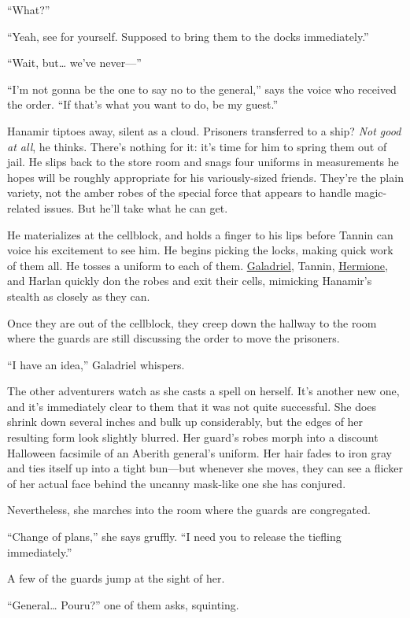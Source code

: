 \documentclass[smalldemyvopaper,11pt,twoside,onecolumn,openright,extrafontsizes]{memoir}
\begin{document}
``What?''

``Yeah, see for yourself. Supposed to bring them to the docks
immediately.''

``Wait, but\ldots{} we've never---''

``I'm not gonna be the one to say no to the general,'' says the voice
who received the order. ``If that's what you want to do, be my guest.''

Hanamir tiptoes away, silent as a cloud. Prisoners transferred to a
ship? \emph{Not good at all}, he thinks. There's nothing for it: it's
time for him to spring them out of jail. He slips back to the store room
and snags four uniforms in measurements he hopes will be roughly
appropriate for his variously-sized friends. They're the plain variety,
not the amber robes of the special force that appears to handle
magic-related issues. But he'll take what he can get.

He materializes at the cellblock, and holds a finger to his lips before
Tannin can voice his excitement to see him. He begins picking the locks,
making quick work of them all. He tosses a uniform to each of them.
\href{/characters/galadriel/}{Galadriel}, Tannin,
\href{/characters/hermione/}{Hermione}, and Harlan quickly don the robes
and exit their cells, mimicking Hanamir's stealth as closely as they
can.

Once they are out of the cellblock, they creep down the hallway to the
room where the guards are still discussing the order to move the
prisoners.

``I have an idea,'' Galadriel whispers.

The other adventurers watch as she casts a spell on herself. It's
another new one, and it's immediately clear to them that it was not
quite successful. She does shrink down several inches and bulk up
considerably, but the edges of her resulting form look slightly blurred.
Her guard's robes morph into a discount Halloween facsimile of an
Aberith general's uniform. Her hair fades to iron gray and ties itself
up into a tight bun---but whenever she moves, they can see a flicker of
her actual face behind the uncanny mask-like one she has conjured.

Nevertheless, she marches into the room where the guards are
congregated.

``Change of plans,'' she says gruffly. ``I need you to release the
tiefling immediately.''

A few of the guards jump at the sight of her.

``General\ldots{} Pouru?'' one of them asks, squinting.
\end{document}
